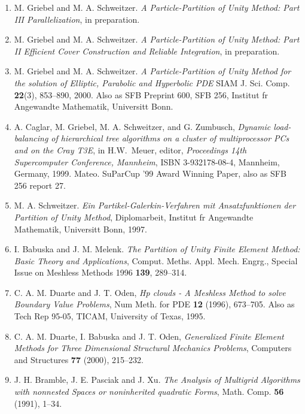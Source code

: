 \documentclass[11pt]{article}
\begin{document}
\begin{enumerate}

\item M. Griebel and M. A. Schweitzer.
{\em A Particle-Partition of Unity Method:
Part III Parallelization}, in preparation.


\item M. Griebel and M. A. Schweitzer.
{\em A Particle-Partition of Unity Method:
Part II Efficient Cover Construction and Reliable
Integration}, in preparation.


\item M. Griebel and M. A. Schweitzer.
{\em A Particle-Partition of Unity Method for the solution
of Elliptic, Parabolic and Hyperbolic PDE}
SIAM J. Sci. Comp. {\bf 22}(3), 853--890, 2000.
Also as SFB Preprint 600, SFB 256, Institut fr Angewandte
Mathematik, Universitt Bonn.


\item A. Caglar, M. Griebel, M. A. Schweitzer, and G. Zumbusch,
{\em Dynamic load-balancing of hierarchical tree algorithms on a
cluster of multiprocessor PCs and on the Cray T3E},
in H.W.~Meuer, editor,
{\em Proceedings 14th Supercomputer Conference, Mannheim},
ISBN 3-932178-08-4, Mannheim, Germany, 1999.
Mateo.  SuParCup '99 Award Winning Paper,
also as SFB 256 report 27.


\item M. A. Schweitzer.
{\em Ein Partikel-Galerkin-Verfahren mit
Ansatzfunktionen der Partition of Unity Method},
Diplomarbeit, Institut fr Angewandte Mathematik,
Universitt Bonn, 1997.


\item I. Babuska and J. M. Melenk.
{\em The Partition of Unity Finite Element Method:
Basic Theory and Applications}, Comput. Meths.
Appl. Mech. Engrg., Special Issue on Meshless Methods 1996
{\bf 139}, 289--314.


\item C. A. M. Duarte and J. T. Oden,
{\em Hp clouds - A Meshless Method to solve Boundary
Value Problems}, Num Meth. for PDE {\bf 12}
(1996), 673--705.
Also as Tech Rep 95-05, TICAM, University of Texas, 1995.


\item C. A. M. Duarte, I. Babuska and J. T. Oden,
{\em Generalized Finite Element Methods for Three
Dimensional Structural Mechanics Problems},
Computers and Structures {\bf 77} (2000), 215--232.


\item J. H. Bramble, J. E. Pasciak and J. Xu.
{\em The Analysis of Multigrid Algorithms with
nonnested Spaces or noninherited quadratic Forms},
Math. Comp. {\bf 56} (1991), 1--34.


\end{enumerate}
\end{document}
